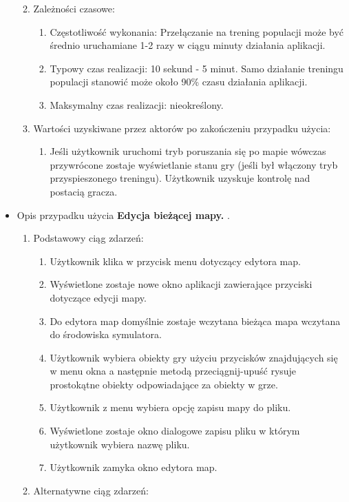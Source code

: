 \begin{par}
\begin{itemize}
\begin{enumerate}
\begin{enumerate}
		\end{enumerate}
	\item Zależności czasowe:
		\begin{enumerate}
		\item Częstotliwość wykonania: Przełączanie na trening populacji może być średnio uruchamiane 1-2 razy w ciągu minuty działania aplikacji. 
		\item Typowy czas realizacji: 10 sekund - 5 minut. Samo działanie treningu populacji stanowić może około 90\% czasu działania aplikacji.
		\item Maksymalny czas realizacji: nieokreślony.
		\end{enumerate}
	\item Wartości uzyskiwane przez aktorów po zakończeniu przypadku użycia:
		\begin{enumerate}
		\item Jeśli użytkownik uruchomi tryb poruszania się po mapie wówczas przywrócone zostaje wyświetlanie stanu gry (jeśli był włączony tryb przyspieszonego treningu). Użytkownik uzyskuje kontrolę nad postacią gracza.
		\end{enumerate}
	\end{enumerate}
	\item
	Opis przypadku użycia {\bf Edycja bieżącej mapy. }.
	\begin{enumerate}
	\item Podstawowy ciąg zdarzeń:
		\begin{enumerate}
		\item Użytkownik klika w przycisk menu dotyczący edytora map.
		\item Wyświetlone zostaje nowe okno aplikacji zawierające przyciski dotyczące edycji mapy.
		\item Do edytora map domyślnie zostaje wczytana bieżąca mapa wczytana do środowiska symulatora.
		\item Użytkownik wybiera obiekty gry użyciu przycisków znajdujących się w menu okna a następnie metodą przeciągnij-upuść rysuje prostokątne obiekty odpowiadające za obiekty w grze.
		\item Użytkownik z menu wybiera opcję zapisu mapy do pliku.
		\item Wyświetlone zostaje okno dialogowe zapisu pliku w którym użytkownik wybiera nazwę pliku.
		\item Użytkownik zamyka okno edytora map.
		\end{enumerate}
	\item Alternatywne ciąg zdarzeń:
		\begin{enumerate}

\end{enumerate}
\end{enumerate}
\end{itemize}
\end{par}
